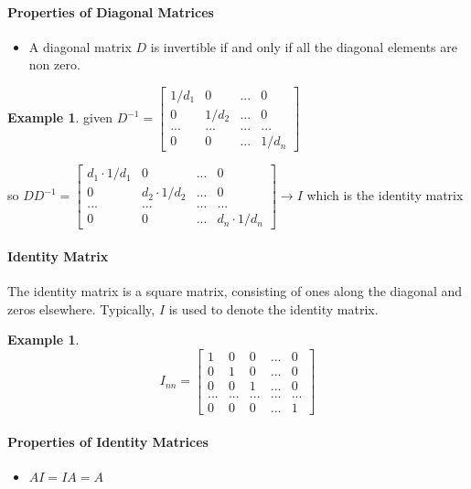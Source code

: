 \documentclass{article}
\theoremstyle{definition}
\newtheorem{example}[theorem]{Example}
\theoremstyle{remark}
\begin{document}
\paragraph{Properties of Diagonal Matrices}

\begin{itemize}
    \item A diagonal matrix $D$ is invertible if and only if all the diagonal elements are non zero.
\end{itemize}

\begin{example}
    given $D^{-1} = \begin{bmatrix}
        1/d_1 & 0 & ... & 0 \\
        0 & 1/d_2 & ... & 0 \\
        ... & ... & ... & ... \\
        0 & 0 & ... & 1/d_n 
    \end{bmatrix}$

    so $DD^{-1} = \begin{bmatrix}
        d_1 \cdot 1/d_1 & 0 & ... & 0 \\
        0 & d_2 \cdot 1/d_2 & ... & 0 \\
        ... & ... & ... & ... \\
        0 & 0 & ... & d_n \cdot 1/d_n
    \end{bmatrix} \rightarrow I $ which is the identity matrix  
\end{example}

\paragraph{Identity Matrix}
The identity matrix is a square matrix, consisting of ones along the diagonal and zeros elsewhere. Typically, $I$ is used to denote the identity matrix. 

\begin{example}
    $$I_{nn} = \begin{bmatrix}
        1 & 0 & 0 & ... & 0 \\
        0 & 1 & 0 & ... & 0 \\
        0 & 0 & 1 & ... & 0 \\
        ... & ... & ... & ... & ... \\
        0 & 0 & 0 & ... & 1
    \end{bmatrix}$$
\end{example}

\paragraph{Properties of Identity Matrices}
\begin{itemize}
    \item $AI = IA = A$
\end{itemize}
\end{document}
